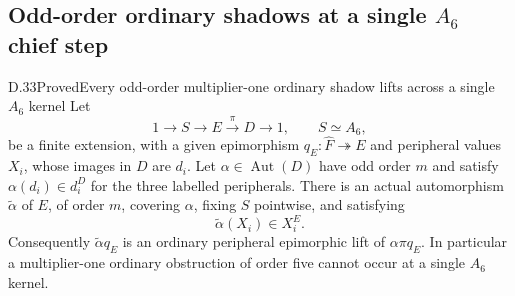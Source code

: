 \subsection{Odd-order ordinary shadows at a single \texorpdfstring{$A_6$}{A6} chief step}

\begin{statement}{D.33}{Proved}{Every odd-order multiplier-one ordinary shadow lifts across a single $A_6$ kernel}
Let
\[
 1\longrightarrow S\longrightarrow E
       \xrightarrow{\pi}D\longrightarrow1,
 \qquad S\simeq A_6,
 \tag{D.33.1}
\]
be a finite extension, with a given epimorphism
$q_E:\widehat F\twoheadrightarrow E$ and
peripheral values $X_i$, whose images in $D$
are $d_i$.  Let $\alpha\in\operatorname{Aut}(D)$
have odd order $m$ and satisfy
$\alpha(d_i)\in d_i^D$ for the three labelled
peripherals.  There is an actual automorphism
$\widetilde\alpha$ of $E$, of order $m$,
covering $\alpha$, fixing $S$ pointwise, and
satisfying
\[
                    \widetilde\alpha(X_i)\in X_i^E.
 \tag{D.33.2}
\]
Consequently $\widetilde\alpha q_E$ is an
ordinary peripheral epimorphic lift of
$\alpha\pi q_E$.  In particular a
multiplier-one ordinary obstruction of
order five cannot occur at a single
$A_6$ kernel.
\end{statement}

